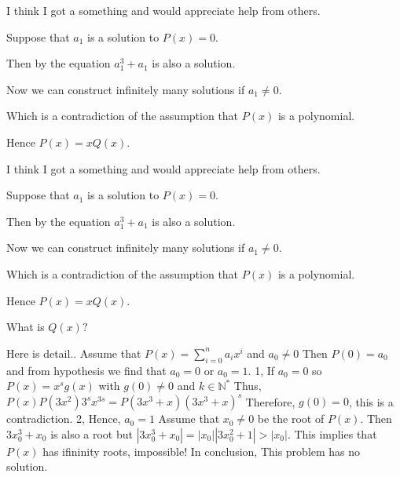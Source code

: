 \begin{solution}
	I think I got a something and would appreciate help from others.

Suppose that $a_1$ is a solution to $P(x)=0$.

Then by the equation $a_1^3+a_1$ is also a solution.

Now we can construct infinitely many solutions if $a_1\ne0$.

Which is a contradiction of the assumption that $P(x)$ is a polynomial.

Hence $P(x)=xQ(x)$.
\end{solution}



\begin{solution}
	\begin{tcolorbox}I think I got a something and would appreciate help from others.

Suppose that $a_1$ is a solution to $P(x)=0$.

Then by the equation $a_1^3+a_1$ is also a solution.

Now we can construct infinitely many solutions if $a_1\ne0$.

Which is a contradiction of the assumption that $P(x)$ is a polynomial.

Hence $P(x)=xQ(x)$.\end{tcolorbox}

What is $Q(x)?$
\end{solution}



\begin{solution}
	Here is detail..
Assume that $ P(x) = \sum_{i=0}^{n}a_ix^i $   and $ a_0 \neq 0 $
Then $ P(0) = a_0 $ and from hypothesis we find that $ a_0 = 0 $ or $ a_0 =1 $.
1, If $ a_0 = 0 $ so $ P(x) = x^sg(x) $ with $ g(0) \neq 0 $ and $ k \in \mathbb{N}^* $
Thus, $ P(x)P(3x^2)3^sx^{3s} = P(3x^3+x)(3x^3+x)^s $
Therefore, $ g(0) = 0 $, this is a contradiction.
2, Hence,  $ a_0 =1 $
Assume that $ x_0 \neq 0 $ be the root of $ P(x) $. Then $ 3x_0^3 +x_0 $ is also a root but $ |3x_0^3 +x_0|=|x_0||3x_0^2+1| > |x_0| $.
This implies that $P(x)$ has ifininity roots, impossible!
In conclusion, This problem has no solution.
\end{solution}



